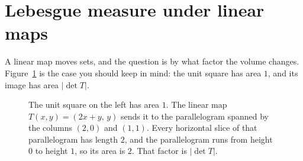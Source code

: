 \section{Lebesgue measure under linear maps}

A linear map moves sets, and the question is by what factor the volume changes. Figure~\ref{fig:rw-det} is the case you should keep in mind: the unit square has area $1$, and its image has area $|\det T|$.

\begin{figure}[ht]
\centering
{}
\caption{The unit square on the left has area $1$. The linear map $T(x,y)=(2x+y,\,y)$ sends it to the parallelogram spanned by the columns $(2,0)$ and $(1,1)$. Every horizontal slice of that parallelogram has length $2$, and the parallelogram runs from height $0$ to height $1$, so its area is $2$. That factor is $|\det T|$.}
\label{fig:rw-det}
\end{figure}

